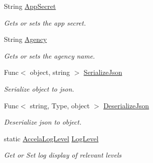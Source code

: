 \begin{DoxyCompactItemize}
String \hyperlink{class_accela_1_1_windows_store_s_d_k_1_1_accela_s_d_k_a42815597dbd6134fcff3fcbdc69294a3}{App\+Secret}
\begin{DoxyCompactList}\small\item\em Gets or sets the app secret. \end{DoxyCompactList}\item 
String \hyperlink{class_accela_1_1_windows_store_s_d_k_1_1_accela_s_d_k_a75e5baf9170d9a86c10d0607e0336071}{Agency}
\begin{DoxyCompactList}\small\item\em Gets or sets the agency name. \end{DoxyCompactList}\item 
Func$<$ object, string $>$ \hyperlink{class_accela_1_1_windows_store_s_d_k_1_1_accela_s_d_k_aa1e3cffaada3d7a8a17dc9a3fbba48a7}{Serialize\+Json}
\begin{DoxyCompactList}\small\item\em Serialize object to json. \end{DoxyCompactList}\item 
Func$<$ string, Type, object $>$ \hyperlink{class_accela_1_1_windows_store_s_d_k_1_1_accela_s_d_k_a43023d85ca7f52d794f8eb3637d1d4ae}{Deserialize\+Json}
\begin{DoxyCompactList}\small\item\em Deserialize json to object. \end{DoxyCompactList}\item 
static \hyperlink{namespace_accela_1_1_windows_store_s_d_k_aaf389cdbcc309b77e2fabfcd0844454b}{Accela\+Log\+Level} \hyperlink{class_accela_1_1_windows_store_s_d_k_1_1_accela_s_d_k_a690dc07789f17f0d5a18c9497f28bf13}{Log\+Level}
\begin{DoxyCompactList}\small\item\em Get or Set log display of relevant levels \end{DoxyCompactList}\end{DoxyCompactItemize}
